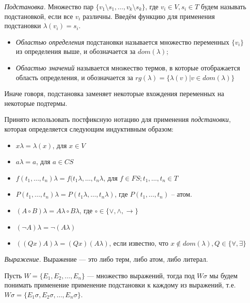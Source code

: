 \begin{definition}
  \emph{Подстановка.} Множество пар $\{v_1 \setminus s_1, \ldots, v_k \setminus s_k\}$, где $v_i \in V, s_i \in T$ будем называть подстановкой, если все $v_i$ различны. Введём функцию для применения подстановки $\lambda(v_i) = s_i$.
\begin{itemize}  
  \item \emph{Областью определения} подстановки называется множество переменных $\{v_i\}$ из определения выше, и обозначается за $dom(\lambda)$; 
  \item \emph{Областью значений} называется множество термов, в которые отображается область определения, и обозначается за $rg(\lambda) = \{\lambda(v) | v \in dom(\lambda)\}$
\end{itemize}
\end{definition}

Иначе говоря, подстановка заменяет некоторые вхождения переменных на некоторые подтермы.

Принято использовать постфиксную нотацию для применения \emph{подстановки}, которая определяется следующим индуктивным образом: 
\begin{itemize}
	\item $x\lambda = \lambda(x)$, для $x \in V$
    \item $a\lambda = a$, для $a \in CS$
    \item $f(t_1, \ldots, t_n)\lambda = f(t_1\lambda, \ldots, t_n\lambda$, для $f \in FS; t_1,\ldots,t_n \in T$
    \item $P(t_1, \ldots, t_n)\lambda = P(t_1\lambda, \ldots, t_n\lambda)$, где $P(t_1, \ldots, t_n)$ -- атом.
    \item $(A \circ B)\lambda = A\lambda \circ B\lambda$, где $\circ \in \{\vee, \wedge, \rightarrow\}$
    \item $(\neg A)\lambda = \neg(A\lambda)$
    \item $((Qx)A)\lambda = (Qx)(A\lambda)$, если известно, что $x \notin dom(\lambda), Q \in \{\forall, \exists\}$
\end{itemize}

\begin{definition}
  \emph{Выражение.} Выражение --- это либо терм, либо атом, либо литерал.
\end{definition}

Пусть $W = \{E_1, E_2, \ldots, E_n\}$ --- множество выражений, тогда под $W\sigma$ мы будем понимать применение применение подстановки к каждому из выражений, т.е. $W\sigma = \{E_1\sigma, E_2\sigma, \ldots, E_n\sigma\}$.

